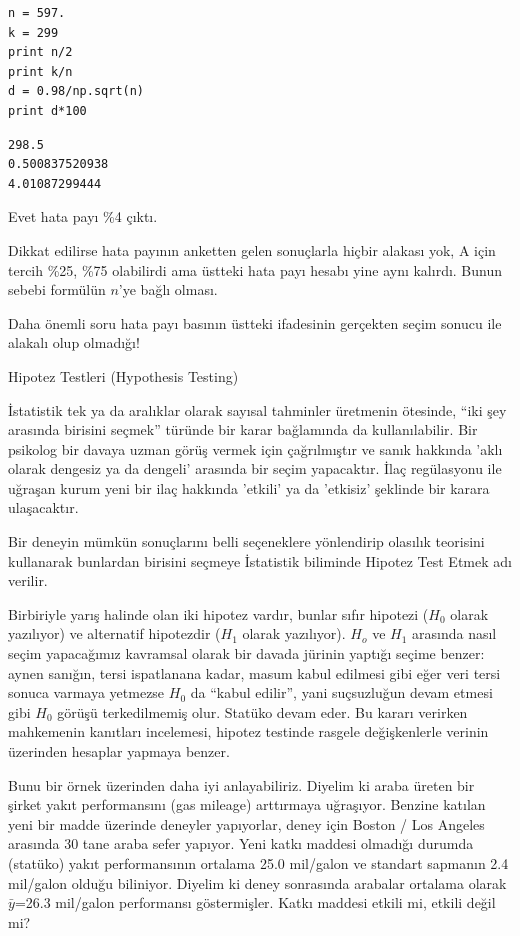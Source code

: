 \documentclass[12pt,fleqn]{article}\usepackage{../../common}
\begin{document}
\begin{verbatim}
n = 597.
k = 299
print n/2
print k/n
d = 0.98/np.sqrt(n) 
print d*100
\end{verbatim}

\begin{verbatim}
298.5
0.500837520938
4.01087299444
\end{verbatim}

Evet hata payı \%4 çıktı. 

Dikkat edilirse hata payının anketten gelen sonuçlarla hiçbir alakası yok,
A için tercih \%25, \%75 olabilirdi ama üstteki hata payı hesabı yine aynı
kalırdı. Bunun sebebi formülün $n$'ye bağlı olması. 

Daha önemli soru hata payı basının üstteki ifadesinin gerçekten seçim
sonucu ile alakalı olup olmadığı! 

Hipotez Testleri (Hypothesis Testing)

İstatistik tek ya da aralıklar olarak sayısal tahminler üretmenin ötesinde,
``iki şey arasında birisini seçmek'' türünde bir karar bağlamında da
kullanılabilir. Bir psikolog bir davaya uzman görüş vermek için
çağrılmıştır ve sanık hakkında 'aklı olarak dengesiz ya da dengeli'
arasında bir seçim yapacaktır. İlaç regülasyonu ile uğraşan kurum yeni bir
ilaç hakkında 'etkili' ya da 'etkisiz' şeklinde bir karara ulaşacaktır. 

Bir deneyin mümkün sonuçlarını belli seçeneklere yönlendirip olasılık
teorisini kullanarak bunlardan birisini seçmeye İstatistik biliminde
Hipotez Test Etmek adı verilir.  

Birbiriyle yarış halinde olan iki hipotez vardır, bunlar sıfır hipotezi
($H_0$ olarak yazılıyor) ve alternatif hipotezdir ($H_1$ olarak
yazılıyor). $H_o$ ve $H_1$ arasında nasıl seçim yapacağımız kavramsal
olarak bir davada jürinin yaptığı seçime benzer: aynen sanığın, tersi
ispatlanana kadar, masum kabul edilmesi gibi eğer veri tersi sonuca varmaya
yetmezse $H_0$ da ``kabul edilir'', yani suçsuzluğun devam etmesi gibi
$H_0$ görüşü terkedilmemiş olur. Statüko devam eder. Bu kararı verirken
mahkemenin kanıtları incelemesi, hipotez testinde rasgele değişkenlerle
verinin üzerinden hesaplar yapmaya benzer.

Bunu bir örnek üzerinden daha iyi anlayabiliriz. Diyelim ki araba üreten
bir şirket yakıt performansını (gas mileage) arttırmaya uğraşıyor. Benzine
katılan yeni bir madde üzerinde deneyler yapıyorlar, deney için Boston /
Los Angeles arasında 30 tane araba sefer yapıyor. Yeni katkı maddesi
olmadığı durumda (statüko) yakıt performansının ortalama 25.0 mil/galon ve
standart sapmanın 2.4 mil/galon olduğu biliniyor. Diyelim ki deney
sonrasında arabalar ortalama olarak $\bar{y}$=26.3 mil/galon performansı
göstermişler. Katkı maddesi etkili mi, etkili değil mi?
\end{document}

